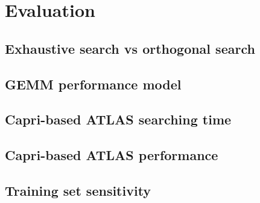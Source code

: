 \section{Evaluation}
\label{sec:evaluation}

  \subsection{Exhaustive search vs \atl orthogonal search}
  \label{sec:exhaustiveVSorthogonal}

  \subsection{GEMM performance model}
  \label{sec:GEMMperf}

  \subsection{Capri-based ATLAS searching time}
  \label{sec:capri_atlas_searching}

  \subsection{Capri-based ATLAS performance}
  \label{sec:capri_atlas_performance}

  \subsection{Training set sensitivity}
  \label{sec:trainingsensitivity}
